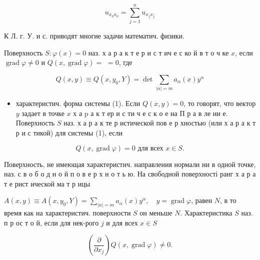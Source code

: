 \documentclass[10pt]{article}
\begin{document}
\[

u_{x_{0} x_{0}}=\sum_{j=1}^{n} u_{x_{j} x_{j}}

\]



К Л. г. У. и с. приводят многие задачи математич. физики.



Поверхность $S: \varphi(x)=0$ наз. х а р а к т е р и с т ич е с ко й в т о ч ке $x$, если $\operatorname{grad} \varphi \neq 0$ и $Q(x, \operatorname{grad} \varphi)=$ $=0$, где



\[

Q(x, y) \equiv Q\left(x, y_{0}, Y\right)=\operatorname{det} \sum_{|\alpha|=m} a_{\alpha}(x) y^{\alpha}

\]



\begin{itemize}

  \item характеристич. форма системы (1). Если $Q(x, y)=0$, то говорят, что вектор $y$ задает в точке $x$ х а $\mathrm{p}$ а к т ер и с ти ч е с к о е на П р а в ле ни е. Поверхность $S$ наз. х а р а к те р истической пов е р хностью (или х а р а к т р и с тикой) для системы (1), если

\end{itemize}



\[

Q(x, \operatorname{grad} \varphi)=0 \text { для всех } x \in S .

\]



Поверхность, не имеющая характеристич. направления нормали ни в одной точке, наз. с в о б о д н о й п о в е р х н о т ь ю. На свободной поверхності ранг х а р а т е рист ической ма т р ицы



$A(x, y) \equiv A\left(x, y_{0}, Y\right)=\sum_{|\alpha|=m} a_{\alpha}(x) y^{\alpha}, \quad y=\operatorname{grad} \varphi$, равен $N$, в то время как на характеристич. поверхности $S$ он меньше $N$. Характеристика $S$ наз. п р ос т о й, если для нек-рого $j$ и для всех $x \in S$



\[

\left(\frac{\partial}{\partial x_{j}}\right) Q(x, \operatorname{grad} \varphi) \neq 0 .

\]
\end{document}
